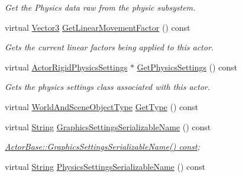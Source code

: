 \begin{DoxyCompactItemize}
\begin{DoxyCompactList}\small\item\em Get the Physics data raw from the physic subsystem. \item\end{DoxyCompactList}\item 
virtual \hyperlink{classMezzanine_1_1Vector3}{Vector3} \hyperlink{classMezzanine_1_1ActorRigid_ac2577cc9bff31ad343d5e179acc95257}{GetLinearMovementFactor} () const 
\begin{DoxyCompactList}\small\item\em Gets the current linear factors being applied to this actor. \item\end{DoxyCompactList}\item 
virtual \hyperlink{classMezzanine_1_1ActorRigidPhysicsSettings}{ActorRigidPhysicsSettings} $\ast$ \hyperlink{classMezzanine_1_1ActorRigid_a6ed901638c88e4b9e09605152e11d56e}{GetPhysicsSettings} () const 
\begin{DoxyCompactList}\small\item\em Gets the physics settings class associated with this actor. \item\end{DoxyCompactList}\item 
virtual \hyperlink{namespaceMezzanine_ae8cd04f706f4998be62f454b7119c718}{WorldAndSceneObjectType} \hyperlink{classMezzanine_1_1ActorRigid_afc18444d5f13990a3458455c217f58cd}{GetType} () const 
\item 
\hypertarget{classMezzanine_1_1ActorRigid_a935069f346c516e07f3aa7a89388dea0}{
virtual \hyperlink{namespaceMezzanine_acf9fcc130e6ebf08e3d8491aebcf1c86}{String} \hyperlink{classMezzanine_1_1ActorRigid_a935069f346c516e07f3aa7a89388dea0}{GraphicsSettingsSerializableName} () const }
\label{classMezzanine_1_1ActorRigid_a935069f346c516e07f3aa7a89388dea0}

\begin{DoxyCompactList}\small\item\em \hyperlink{classMezzanine_1_1ActorBase_a636a0dbf78907d565d4cabd994442637}{ActorBase::GraphicsSettingsSerializableName() const}; \item\end{DoxyCompactList}\item 
\hypertarget{classMezzanine_1_1ActorRigid_ac91177e6d50052f97997a4dfef975a59}{
virtual \hyperlink{namespaceMezzanine_acf9fcc130e6ebf08e3d8491aebcf1c86}{String} \hyperlink{classMezzanine_1_1ActorRigid_ac91177e6d50052f97997a4dfef975a59}{PhysicsSettingsSerializableName} () const }
\label{classMezzanine_1_1ActorRigid_ac91177e6d50052f97997a4dfef975a59}


\end{DoxyCompactItemize}
